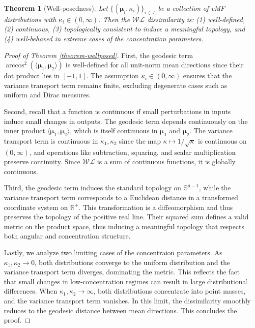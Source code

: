 \documentclass[10pt]{article}
\newtheorem{theorem}{Theorem}[section]
\newcommand{\bfmu}{\boldsymbol{\mu}}
\newcommand{\bbS}{\mathbb{S}}
\newcommand{\bbRpos}{\mathbb{R}^+}
\newcommand{\WL}{\mathcal{WL}}
\begin{document}
\begin{theorem}[Well-posedness]\label{theorem-wellposed}
	Let $\lbrace (\bfmu_i,\kappa_i)\rbrace_{i\in \mathcal{I}}$ be a collection of vMF distributions with $\kappa_i \in (0, \infty)$. Then the $\WL$ dissimilarity is: (1) well-defined, (2) continuous, (3) topologically consistent to induce a meaningful topology, and (4) well-behaved in extreme cases of the concentration parameters.
\end{theorem}
\begin{proof}[Proof of Theorem \eqref{theorem-wellposed}]
	First, the geodesic term $\arccos^2(\langle \bfmu_1, \bfmu_2 \rangle)$ is well-defined for all unit-norm mean directions since their dot product lies in $[-1,1]$. The assumption $\kappa_i \in (0, \infty)$ ensures that the variance transport term remains finite, excluding degenerate cases such as uniform and Dirac measures.
	
	Second, recall that a function is continuous if small perturbations in inputs induce small changes in outputs. The geodesic term depends continuously on the inner product $\langle \bfmu_1, \bfmu_2 \rangle$, which is itself continuous in $\bfmu_1$ and $\bfmu_2$. The variance transport term is continuous in $\kappa_1, \kappa_2$ since the map $\kappa \mapsto 1/\sqrt{\kappa}$ is continuous on $(0,\infty)$, and operations like subtraction, squaring, and scalar multiplication preserve continuity. Since $\WL$ is a sum of continuous functions, it is globally continuous.
	
	Third, the geodesic term induces the standard topology on $\bbS^{d-1}$, while the variance transport term corresponds to a Euclidean distance in a transformed coordinate system on $\bbRpos$. This transformation is a diffeomorphism and thus preserves the topology of the positive real line. Their squared sum defines a valid metric on the product space, thus inducing a meaningful topology that respects both angular and concentration structure.
	
	Lastly, we analyze two limiting cases of the concentraion parameters. As $\kappa_1, \kappa_2 \to 0$, both distributions converge to the uniform distribution and the variance transport term diverges, dominating the metric. This reflects the fact that small changes in low-concentration regimes can result in large distributional differences. When $\kappa_1, \kappa_2 \to \infty$, both distributions concentrate into point masses, and the variance transport term vanishes. In this limit, the dissimilarity smoothly reduces to the geodesic distance between mean directions. This concludes the proof.
\end{proof}
\end{document}
